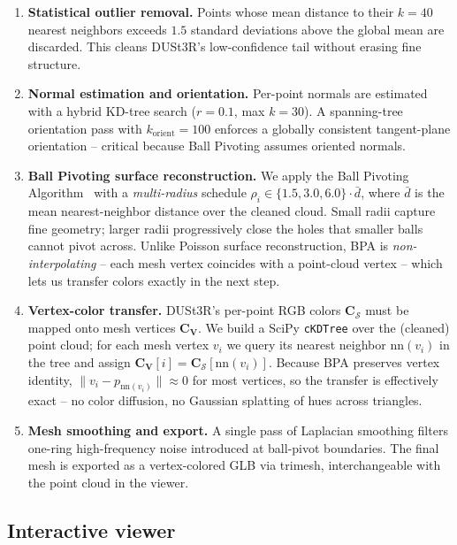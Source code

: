 \documentclass{article}
\begin{document}
\begin{enumerate}
  \item \textbf{Statistical outlier removal.} Points whose mean
  distance to their $k = 40$ nearest neighbors exceeds $1.5$ standard
  deviations above the global mean are discarded. This cleans DUSt3R's
  low-confidence tail without erasing fine structure.

  \item \textbf{Normal estimation and orientation.} Per-point normals
  are estimated with a hybrid KD-tree search ($r = 0.1$, max $k = 30$).
  A spanning-tree orientation pass with $k_{\mathrm{orient}} = 100$
  enforces a globally consistent tangent-plane orientation -- critical
  because Ball Pivoting assumes oriented normals.

  \item \textbf{Ball Pivoting surface reconstruction.} We apply the
  Ball Pivoting Algorithm~\cite{bpa} with a \emph{multi-radius}
  schedule $\rho_i \in \{1.5, 3.0, 6.0\} \cdot \bar{d}$, where
  $\bar{d}$ is the mean nearest-neighbor distance over the cleaned
  cloud. Small radii capture fine geometry; larger radii progressively
  close the holes that smaller balls cannot pivot across. Unlike
  Poisson surface reconstruction, BPA is \emph{non-interpolating} --
  each mesh vertex coincides with a point-cloud vertex -- which lets us
  transfer colors exactly in the next step.

  \item \textbf{Vertex-color transfer.} DUSt3R's per-point RGB colors
  $\mathbf{C}_\mathcal{S}$ must be mapped onto mesh vertices
  $\mathbf{C}_\mathbf{V}$. We build a SciPy \texttt{cKDTree} over the
  (cleaned) point cloud; for each mesh vertex $v_i$ we query its
  nearest neighbor $\mathrm{nn}(v_i)$ in the tree and assign
  $\mathbf{C}_\mathbf{V}[i] = \mathbf{C}_\mathcal{S}[\mathrm{nn}(v_i)]$.
  Because BPA preserves vertex identity,
  $\lVert v_i - p_{\mathrm{nn}(v_i)} \rVert \approx 0$ for most
  vertices, so the transfer is effectively exact -- no color diffusion,
  no Gaussian splatting of hues across triangles.

  \item \textbf{Mesh smoothing and export.} A single pass of Laplacian
  smoothing filters one-ring high-frequency noise introduced at
  ball-pivot boundaries. The final mesh is exported as a
  vertex-colored GLB via trimesh, interchangeable with the point cloud
  in the viewer.
\end{enumerate}

\subsection{Interactive viewer}
\label{sec:method-viewer}
\end{document}

